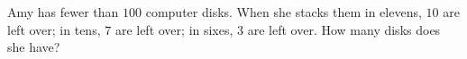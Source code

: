 Amy has fewer than $100$ computer disks. When she stacks them in elevens, $10$ are left over; in tens, $7$ are left over; in sixes, $3$ are left over. How many disks does she have?
